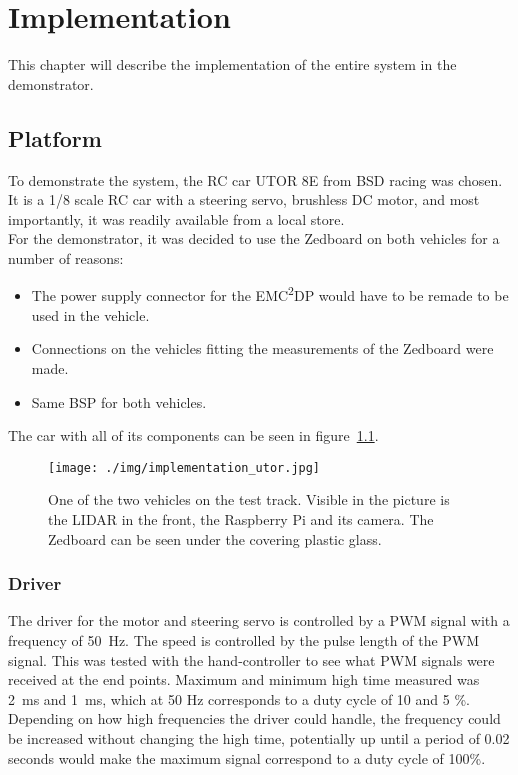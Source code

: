\chapter{Implementation}
This chapter will describe the implementation of the entire system in the demonstrator.

\section{Platform}
To demonstrate the system, the RC car UTOR 8E from BSD racing was chosen. It is a 1/8 scale RC car with a steering servo, brushless DC motor, and most importantly, it was readily available from a local store.\\

For the demonstrator, it was decided to use the Zedboard on both vehicles for a number of reasons:
\begin{itemize}
\item The power supply connector for the EMC\textsuperscript{2}DP would have to be remade to be used in the vehicle.
\item Connections on the vehicles fitting the measurements of the Zedboard were made.
\item Same BSP for both vehicles.
\end{itemize}

The car with all of its components can be seen in figure~\ref{fig:utor_overview}.

\begin{figure}[H]
\centering
\texttt{[image: ./img/implementation\_utor.jpg]}
\caption{One of the two vehicles on the test track. Visible in the picture is the LIDAR in the front, the Raspberry Pi and its camera. The Zedboard can be seen under the covering plastic glass.}
\label{fig:utor_overview}
\end{figure}

\subsection{Driver}
The driver for the motor and steering servo is controlled by a PWM signal with a frequency of 50~Hz. The speed is controlled by the pulse length of the PWM signal. This was tested with the hand-controller to see what PWM signals were received at the end points. Maximum and minimum high time measured was 2~ms and 1~ms, which at 50 Hz corresponds to a duty cycle of 10 and 5 \%. Depending on how high frequencies the driver could handle, the frequency could be increased without changing the high time, potentially up until a period of 0.02 seconds would make the maximum signal correspond to a duty cycle of 100\%.\\

